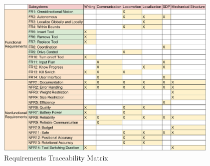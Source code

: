 \begin{figure}[h!]
\centering
\includegraphics[width=0.95\textwidth]{figs/requirements_matrix.pdf}
\caption{Requirements Traceability Matrix}
\label{fig:req_matrix}
\end{figure}

\clearpage
